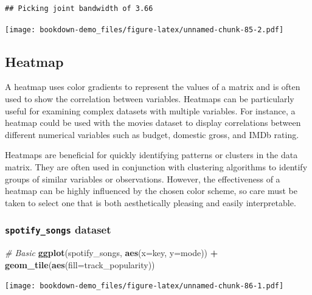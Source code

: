 \documentclass[
  b5paper]{book}
\newenvironment{Shaded}{\begin{snugshade}}{\end{snugshade}}
\newcommand{\AttributeTok}[1]{\textcolor[rgb]{0.13,0.29,0.53}{#1}}
\newcommand{\CommentTok}[1]{\textcolor[rgb]{0.56,0.35,0.01}{\textit{#1}}}
\newcommand{\FunctionTok}[1]{\textcolor[rgb]{0.13,0.29,0.53}{\textbf{#1}}}
\newcommand{\NormalTok}[1]{#1}
\newcommand{\SpecialCharTok}[1]{\textcolor[rgb]{0.81,0.36,0.00}{\textbf{#1}}}
\begin{document}
\begin{verbatim}
## Picking joint bandwidth of 3.66
\end{verbatim}

\texttt{[image: bookdown-demo\_files/figure-latex/unnamed-chunk-85-2.pdf]}

\hypertarget{heatmap}{%
\subsection*{Heatmap}\label{heatmap}}

A heatmap uses color gradients to represent the values of a matrix and is often used to show the correlation between variables. Heatmaps can be particularly useful for examining complex datasets with multiple variables. For instance, a heatmap could be used with the movies dataset to display correlations between different numerical variables such as budget, domestic gross, and IMDb rating.

Heatmaps are beneficial for quickly identifying patterns or clusters in the data matrix. They are often used in conjunction with clustering algorithms to identify groups of similar variables or observations. However, the effectiveness of a heatmap can be highly influenced by the chosen color scheme, so care must be taken to select one that is both aesthetically pleasing and easily interpretable.

\hypertarget{spotify_songs-dataset-8}{%
\subsubsection*{\texorpdfstring{\texttt{spotify\_songs} dataset}{spotify\_songs dataset}}\label{spotify_songs-dataset-8}}

\begin{Shaded}
\begin{Highlighting}[]
\CommentTok{\# Basic}
\FunctionTok{ggplot}\NormalTok{(spotify\_songs, }\FunctionTok{aes}\NormalTok{(}\AttributeTok{x=}\NormalTok{key, }\AttributeTok{y=}\NormalTok{mode)) }\SpecialCharTok{+} \FunctionTok{geom\_tile}\NormalTok{(}\FunctionTok{aes}\NormalTok{(}\AttributeTok{fill=}\NormalTok{track\_popularity))}
\end{Highlighting}
\end{Shaded}

\texttt{[image: bookdown-demo\_files/figure-latex/unnamed-chunk-86-1.pdf]}
\end{document}
